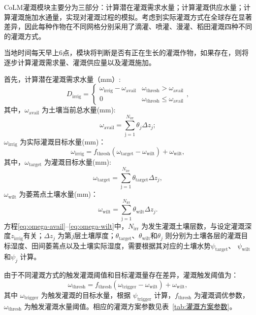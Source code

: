 CoLM灌溉模块主要分为三部分：计算潜在灌溉需求水量；计算灌溉供应水量；计算灌溉施加水通量，实现对灌溉过程的模拟。考虑到实际灌溉方式在全球存在显著差异，因此每种作物在不同网格分别采用了滴灌、喷灌、漫灌、稻田灌溉四种不同的灌溉方式。

当地时间每天早上6点，模块将判断是否有正在生长的灌溉作物，如果存在，则将逐步计算灌溉需求量、灌溉供应量以及灌溉施加。

首先，计算潜在灌溉需求水量（mm）:
\begin{equation}
  D_{\mathrm{irrig}} = \begin{cases}
    \omega_{\mathrm{irrig}} - \omega_{\mathrm{avail}} & \omega_{\mathrm{thresh}} > \omega_{\mathrm{avail}} \\
    0     & \omega_{\mathrm{thresh}} \leqslant \omega_{\mathrm{avail}}
  \end{cases},
\end{equation}
其中，$\omega_{\mathrm{avail}}$ 为土壤当前总水量(mm):
\begin{equation}\label{eq:omega-avail}
  \omega_{\mathrm{avail}} = \sum_{\mathrm{j=1}}^{N_{\mathrm{irr}}}\theta_j\Delta z_j;
\end{equation}
$\omega_{\mathrm{irrig}}$ 为实际灌溉目标水量(mm)：
\begin{equation}
  \omega_{\mathrm{irrig}} = f_{\mathrm{thresh}}(\omega_{\mathrm{target}}-\omega_{\mathrm{wilt}}) + \omega_{\mathrm{wilt}},
\end{equation}
其中，$\omega_{\mathrm{target}}$ 为灌溉目标水量(mm):
\begin{equation}
  \omega_{\mathrm{target}} = \sum_{\mathrm{j=1}}^{N_{\mathrm{irr}}}\theta_{\mathrm{target}}\Delta z_j,
\end{equation}
$\omega_{\mathrm{wilt}}$ 为萎蔫点土壤水量(mm)：
\begin{equation}\label{eq:omega-wilt}
  \omega_{\mathrm{wilt}} = \sum_{\mathrm{j=1}}^{N_{\mathrm{irr}}}\theta_{\mathrm{wilt}}\Delta z_j.
\end{equation}
方程\eqref{eq:omega-avail}--\eqref{eq:omega-wilt}中，$N_{\mathrm{irr}}$ 为发生灌溉土壤层数，与设定灌溉深度$z_{\mathrm{irrig}}$有关；$\Delta z_j$ 为第$j$层土壤厚度；$\theta_{\mathrm{target}}$、$\theta_{\mathrm{wilt}}$和$\theta_j$ 则分别为土壤各层的灌溉目标湿度、田间萎蔫点以及土壤实际湿度，需要根据其对应的土壤水势$\psi_{\mathrm{target}}$、 $\psi_{\mathrm{wilt}}$和$\psi_j$ 计算。

由于不同灌溉方式的触发灌溉阈值和目标灌溉量存在差异，灌溉触发阈值为：
\begin{equation}
  \omega_{\mathrm{thresh}} = f_{\mathrm{thresh}}(\omega_{\mathrm{trigger}}-\omega_{\mathrm{wilt}}) + \omega_{\mathrm{wilt}},
\end{equation}
其中 $\omega_{\mathrm{trigger}}$ 为触发灌溉的目标水量，根据 $\psi_{\mathrm{trigger}}$ 计算，$f_{\mathrm{thresh}}$ 为灌溉调优参数，$\omega_{\mathrm{thresh}}$ 为触发灌溉水量阈值。相应的灌溉方案参数见表~\ref{tab:灌溉方案参数}。

